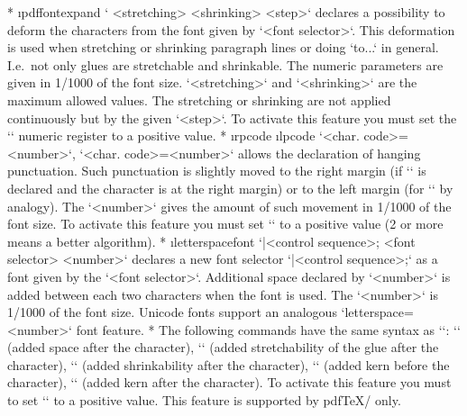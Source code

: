 {\begitems
* \i pdffontexpand 
  ` <stretching> <shrinking> <step>`
  declares a possibility to deform the characters from the font given by
  `<font selector>`. This deformation is used when stretching or shrinking
  paragraph lines or doing `\hbox to{...}` in general. I.e.\ not only glues are
  stretchable and shrinkable. The numeric parameters are given in 1/1000
  of the font size. `<stretching>` and `<shrinking>` are the maximum allowed
  values. The stretching or shrinking are not applied continuously but by
  the given `<step>`.
  To activate this feature you must set the \x`\pdfadjustspacing`
  numeric register to a positive value. 
* \i rpcode \i lpcode 
  `<char. code>=<number>`,
  `<char. code>=<number>` allows the declaration of
  hanging punctuation. Such punctuation is slightly moved to the right
  margin (if `\rpcode` is declared and the character is at the right margin) 
  or to the left margin (for `\lpcode` by analogy).
  The `<number>` gives the amount of such movement in 1/1000 of the font size.
  To activate this feature you must set \x`\pdfprotrudechars` to
  a positive value (2 or more means a better algorithm).
* \i letterspacefont
  ` |<control sequence>; <font selector> <number>`
  declares a new font selector `|<control sequence>;` as a font given by
  the `<font selector>`. Additional space declared by `<number>` is added
  between each two characters when the font is used. The `<number>` is 1/1000 of
  the font size. Unicode fonts support an analogous
  `letterspace=<number>` font feature. 
* The following commands have the same syntax as `\rpcode`:
  \x`\knbscode` (added space after the character),
  \x`\stbscode` (added stretchability of the glue after the character),
  \x`\shbscode` (added shrinkability after the character),
  \x`\knbccode` (added kern before the character),
  \x`\knaccode` (added kern after the character).
  To activate this feature you must to set
  \x`\pdfadjustinterwordglue` to a positive value.
  This feature is supported by pdf\TeX/ only.
\enditems


}
